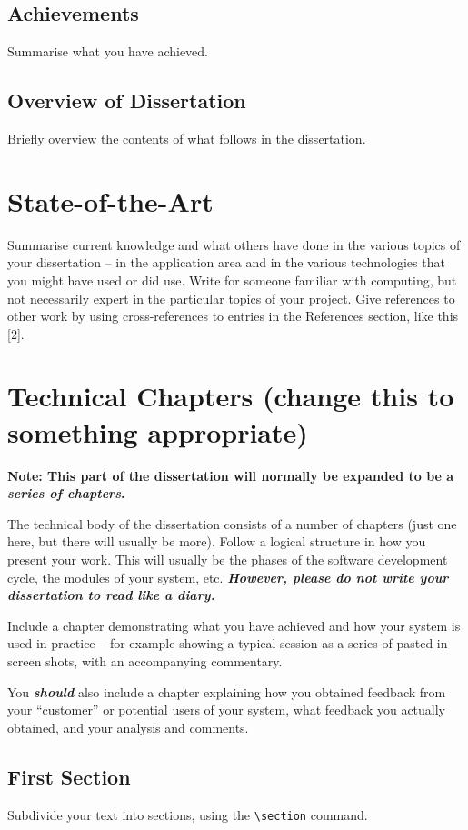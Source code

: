 \documentclass[11pt]{report}
\newcommand{\cmd}[1]{\texttt{\textbackslash{}#1}}
\begin{document}
\section{Achievements}
Summarise what you have achieved.

\section{Overview of Dissertation}
Briefly overview the contents of what follows in the dissertation.

\chapter{State-of-the-Art}
Summarise current knowledge and what others have done in the various topics of your dissertation -- in the application area and in the various technologies that you might have used or did use. Write for someone familiar with computing, but not necessarily expert in the particular topics of your project. Give references to other work by using cross-references to entries in the References section, like this [2].

\chapter{Technical Chapters (change this to something appropriate)}
\textbf{Note: This part of the dissertation will normally be expanded to be a \textit{series of chapters}.}

The technical body of the dissertation consists of a number of chapters (just one here, but there will usually be more).  Follow a logical structure in how you present your work.  This will usually be the phases of the software development cycle, the modules of your system, etc. \textbf{\textit{However, please do not write your dissertation to read like a diary.}}

Include a chapter demonstrating what you have achieved and how your system is used in practice -- for example showing a typical session as a series of pasted in screen shots, with an accompanying commentary.

You \textbf{\textit{should}} also include a chapter explaining how you obtained feedback from your ``customer'' or potential users of your system, what feedback you actually obtained, and your analysis and comments.

\section{First Section}
Subdivide your text into sections, using the \cmd{section} command.
\end{document}
